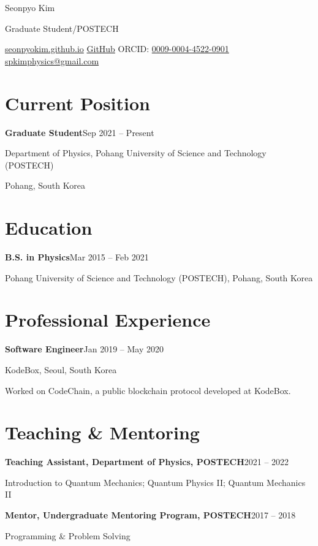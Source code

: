 \documentclass[10pt]{article}
\makeatletter
\newcommand{\entry}[2]{%
  \par\if@nobreak\else\addvspace{6pt}\fi
  \textbf{#1}\hfill{\fontsize{9}{11}\selectfont\color{dim}#2}\par\nopagebreak}
\newcommand{\dimline}[1]{{\color{dim}#1}\par}
\newcommand{\sep}{\enspace{\color{rule}|}\enspace}
\makeatother
\begin{document}
\fontsize{10.5}{13}\selectfont
\color{ink}
\raggedright

{\fontsize{28}{32}\selectfont Seonpyo Kim\par}
\vspace{4pt}
{\fontsize{12.5}{15}\selectfont Graduate Student\enspace/\enspace POSTECH\par}
\vspace{7pt}
{\fontsize{9}{11}\selectfont
  \href{https://seonpyokim.github.io}{seonpyokim.github.io}\sep
  \href{https://github.com/seonpyoKim}{GitHub}\sep
  ORCID: \href{https://orcid.org/0009-0004-4522-0901}{0009-0004-4522-0901}\sep
  \href{mailto:spkimphysics@gmail.com}{spkimphysics@gmail.com}\par}
\vspace{4pt}

\section*{Current Position}

\entry{Graduate Student}{Sep 2021 -- Present}
Department of Physics, Pohang University of Science and Technology (POSTECH)\par
\dimline{Pohang, South Korea}

\section*{Education}

\entry{B.S. in Physics}{Mar 2015 -- Feb 2021}
Pohang University of Science and Technology (POSTECH), Pohang, South Korea\par

\section*{Professional Experience}

\entry{Software Engineer}{Jan 2019 -- May 2020}
KodeBox, Seoul, South Korea\par
Worked on CodeChain, a public blockchain protocol developed at KodeBox.\par

\section*{Teaching \& Mentoring}

\entry{Teaching Assistant, Department of Physics, POSTECH}{2021 -- 2022}
\dimline{Introduction to Quantum Mechanics; Quantum Physics II; Quantum Mechanics II}

\entry{Mentor, Undergraduate Mentoring Program, POSTECH}{2017 -- 2018}
\dimline{Programming \& Problem Solving}
\end{document}
